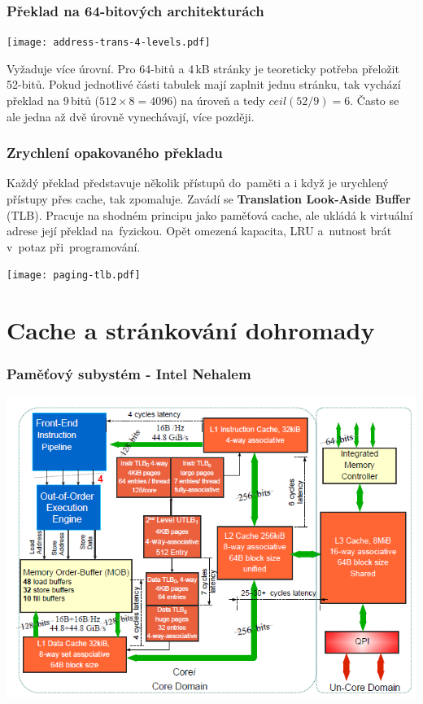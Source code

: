\documentclass{beamer}
\begin{document}
\begin{frame}
\frametitle{Překlad na 64-bitových architekturách}

{
\centering

\texttt{[image: address-trans-4-levels.pdf]}

}

Vyžaduje více úrovní. Pro 64-bitů a 4\,kB stránky je teoreticky
potřeba přeložit 52-bitů. Pokud jednotlivé části tabulek mají
zaplnit jednu stránku, tak vychází překlad na 9\,bitů ($512 \times 8 = 4096$)
na úroveň a tedy $ceil(52 / 9) = 6$. Často se ale jedna až dvě úrovně vynechávají, více později.


\end{frame}

\begin{frame}
\frametitle{Zrychlení opakovaného překladu}

Každý překlad představuje několik přístupů do~paměti a i když je urychlený
přístupy přes cache, tak zpomaluje. Zavádí se \textbf{Translation Look-Aside Buffer} (TLB).
Pracuje na shodném principu jako paměťová cache, ale ukládá k virtuální adrese
její překlad na~fyzickou. Opět omezená kapacita, LRU a~nutnost brát v~potaz
při~programování.

\vskip 2mm

{
\centering

\texttt{[image: paging-tlb.pdf]}

}
\end{frame}

\section{Cache a stránkování dohromady}

\begin{frame}
\frametitle{Paměťový subystém - Intel Nehalem}

{
\centering

\includegraphics[width=0.80\linewidth]{fig/mem-nehalem-lat.png}

}

\end{frame}
\end{document}
